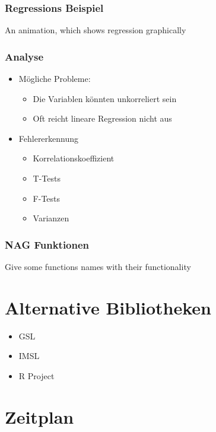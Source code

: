 \documentclass{beamer}
\begin{document}
\begin{frame}
 \frametitle{Regressions Beispiel}

 An animation, which shows regression graphically
\end{frame}

\begin{frame}
 \frametitle{Analyse}
 \begin{itemize}
  \item Mögliche Probleme:
  \begin{itemize}
   \item Die Variablen k\"onnten unkorreliert sein
   \item Oft reicht lineare Regression nicht aus
  \end{itemize}

  \item Fehlererkennung
  \begin{itemize}
   \item Korrelationskoeffizient
   \item T-Tests
   \item F-Tests
   \item Varianzen
  \end{itemize}

 \end{itemize}

\end{frame}

\begin{frame}
 \frametitle{NAG Funktionen}

 Give some functions names with their functionality 
\end{frame}


\section{Alternative Bibliotheken}

\begin{frame}
 \begin{itemize}
  \item GSL
  \item IMSL
  \item R Project
 \end{itemize}

\end{frame}


\section{Zeitplan}
\end{document}
